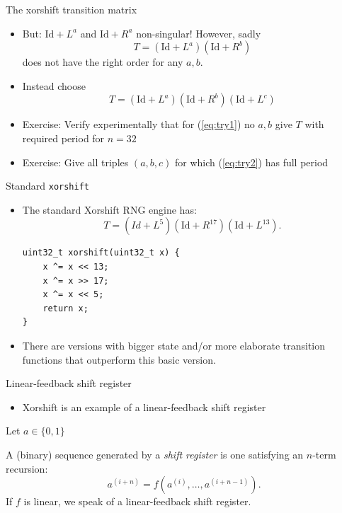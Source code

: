 \documentclass[10pt]{beamer}
\begin{document}
\begin{frame}[label={sec:org5aa53f4}]{The xorshift transition matrix}
\begin{itemize}
\item But: \(\text{Id} + L^a\) and \(\text{Id} + R^a\) non-singular! However, sadly
\begin{equation}
T = (\text{Id} + L^a)(\text{Id} + R^b)
\label{eq:try1}
\end{equation}
does not have the right order for any \(a, b\).
\item Instead choose 
\begin{equation}
T = (\text{Id} + L^a)(\text{Id} + R^b)(\text{Id} +
L^c)
\label{eq:try2}
\end{equation}
\item \alert{\alert{Exercise:}} Verify experimentally that for (\ref{eq:try1}) no \(a, b\) give \(T\) with required period for \(n = 32\)
\item \alert{\alert{Exercise:}}  Give all triples \((a, b, c)\) for which (\ref{eq:try2}) has full period
\end{itemize}
\end{frame}
\begin{frame}[fragile,label={sec:org64d9d12}]{Standard \texttt{xorshift}}
 \begin{itemize}
\item The standard Xorshift RNG engine has:
$$T = (Id + L^{5})(\text{Id} + R^{17})(\text{Id} + L^{13}).$$
\begin{verbatim}
uint32_t xorshift(uint32_t x) {
    x ^= x << 13;
    x ^= x >> 17;
    x ^= x << 5;
    return x;
}
\end{verbatim}
\item There are versions with bigger state and/or more elaborate transition functions that outperform this basic version.
\end{itemize}
\end{frame}
\begin{frame}[label={sec:org6005dd1}]{Linear-feedback shift register}
\begin{itemize}
\item Xorshift is an example of a linear-feedback shift register
\end{itemize}

Let \(a \in \{0, 1\}\)
\begin{definition}
A (binary) sequence generated by a \emph{shift register} is one satisfying an $n$-term recursion:
$$a^{(i + n)} = f(a^{(i)}, \ldots, a^{(i + n - 1)}).$$
If $f$ is linear, we speak of a linear-feedback shift register.
\end{definition}
\end{frame}
\end{document}
